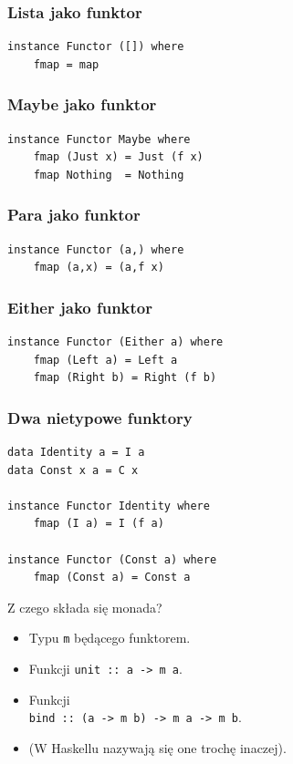 \documentclass[14pt]{beamer}
\begin{document}
\begin{frame}[fragile]
\frametitle{Lista jako funktor}
\begin{verbatim}
instance Functor ([]) where
    fmap = map
\end{verbatim}
\end{frame}

\begin{frame}[fragile]
\frametitle{Maybe jako funktor}
\begin{verbatim}
instance Functor Maybe where
    fmap (Just x) = Just (f x)
    fmap Nothing  = Nothing
\end{verbatim}
\end{frame}

\begin{frame}[fragile]
\frametitle{Para jako funktor}
\begin{verbatim}
instance Functor (a,) where
    fmap (a,x) = (a,f x)
\end{verbatim}
\end{frame}

\begin{frame}[fragile]
\frametitle{Either jako funktor}
\begin{verbatim}
instance Functor (Either a) where
    fmap (Left a) = Left a
    fmap (Right b) = Right (f b)
\end{verbatim}
\end{frame}

\begin{frame}[fragile]
\frametitle{Dwa nietypowe funktory}
\begin{verbatim}
data Identity a = I a
data Const x a = C x

instance Functor Identity where
    fmap (I a) = I (f a)

instance Functor (Const a) where
    fmap (Const a) = Const a
\end{verbatim}
\end{frame}

\begin{frame}{Z czego składa się monada?}
    \begin{itemize}
        \item Typu \texttt{m} będącego funktorem.
        \item Funkcji \texttt{unit :: a -> m a}.
        \item Funkcji\\
            \texttt{bind :: (a -> m b) -> m a -> m b}.
        \pause
        \item (W Haskellu nazywają się one trochę inaczej).
    \end{itemize}
\end{frame}
\end{document}
